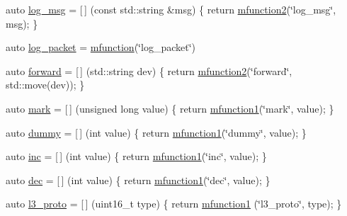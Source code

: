 \begin{DoxyCompactItemize}
\item 
auto \hyperlink{namespacepfq_1_1lang_1_1anonymous__namespace_02default_8hpp_03_a82e76226844f043aac9a2dd01615c9bb}{log\+\_\+msg} = \mbox{[}$\,$\mbox{]} (const std\+::string \&msg) \{ return \hyperlink{namespacepfq_1_1lang_a16b7f6ec56c0c3450383a9a0cbf0923b}{mfunction2}(\char`\"{}log\+\_\+msg\char`\"{}, msg); \}
\item 
auto \hyperlink{namespacepfq_1_1lang_1_1anonymous__namespace_02default_8hpp_03_aed6076a98aece625738cbda3689183e2}{log\+\_\+packet} = \hyperlink{namespacepfq_1_1lang_ac3ec84f09576bf5fb5db464623a4c165}{mfunction}(\char`\"{}log\+\_\+packet\char`\"{})
\item 
auto \hyperlink{namespacepfq_1_1lang_1_1anonymous__namespace_02default_8hpp_03_aae08247030fea0f5e398b0a03d382257}{forward} = \mbox{[}$\,$\mbox{]} (std\+::string dev) \{ return \hyperlink{namespacepfq_1_1lang_a16b7f6ec56c0c3450383a9a0cbf0923b}{mfunction2}(\char`\"{}forward\char`\"{}, std\+::move(dev)); \}
\item 
auto \hyperlink{namespacepfq_1_1lang_1_1anonymous__namespace_02default_8hpp_03_a7b831baeabda070b89ca862a9445a4a8}{mark} = \mbox{[}$\,$\mbox{]} (unsigned long value) \{ return \hyperlink{namespacepfq_1_1lang_a68d775c68562fbd0ab9ef213f2519499}{mfunction1}(\char`\"{}mark\char`\"{}, value); \}
\item 
auto \hyperlink{namespacepfq_1_1lang_1_1anonymous__namespace_02default_8hpp_03_ab1a38555cb05c81863153fa6113395e3}{dummy} = \mbox{[}$\,$\mbox{]} (int value) \{ return \hyperlink{namespacepfq_1_1lang_a68d775c68562fbd0ab9ef213f2519499}{mfunction1}(\char`\"{}dummy\char`\"{}, value); \}
\item 
auto \hyperlink{namespacepfq_1_1lang_1_1anonymous__namespace_02default_8hpp_03_acc7d3a4cca5eb30ff5456e19c613b174}{inc} = \mbox{[}$\,$\mbox{]} (int value) \{ return \hyperlink{namespacepfq_1_1lang_a68d775c68562fbd0ab9ef213f2519499}{mfunction1}(\char`\"{}inc\char`\"{}, value); \}
\item 
auto \hyperlink{namespacepfq_1_1lang_1_1anonymous__namespace_02default_8hpp_03_a139906841e77a2eb86b761b27ceeb685}{dec} = \mbox{[}$\,$\mbox{]} (int value) \{ return \hyperlink{namespacepfq_1_1lang_a68d775c68562fbd0ab9ef213f2519499}{mfunction1}(\char`\"{}dec\char`\"{}, value); \}
\item 
auto \hyperlink{namespacepfq_1_1lang_1_1anonymous__namespace_02default_8hpp_03_a1515f230673119530cd04f213627976f}{l3\+\_\+proto} = \mbox{[}$\,$\mbox{]} (uint16\+\_\+t type) \{ return \hyperlink{namespacepfq_1_1lang_a68d775c68562fbd0ab9ef213f2519499}{mfunction1} (\char`\"{}l3\+\_\+proto\char`\"{}, type); \}

\end{DoxyCompactItemize}
